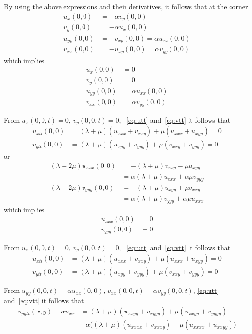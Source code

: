 \documentclass[11pt]{article}
\begin{document}
By using the above expressions and their derivatives, it follows that at the corner
\begin{align}
   u_x(0,0) &= - \alpha v_y(0,0) \\
   v_y(0,0) &= - \alpha u_x(0,0) \\
   u_{yy}(0,0) &= - v_{xy}(0,0) = \alpha u_{xx}(0,0) \\
   v_{xx}(0,0)&=-u_{xy}(0,0) = \alpha v_{yy}(0,0) 
\end{align}
which implies 
\begin{align}
   u_x(0,0) &=0 \\
   v_y(0,0) &=0 \\
   u_{yy}(0,0) &= \alpha u_{xx}(0,0) \\
   v_{xx}(0,0) &= \alpha v_{yy}(0,0) 
\end{align}

From $u_x(0,0,t)=0$, $v_y(0,0,t)=0$, ~\eqref{eq:utt} and~\eqref{eq:vtt} it follows that
\begin{align}
   u_{xtt}(0,0) &= (\lambda+\mu)(u_{xxx} + v_{xxy}) + \mu(u_{xxx} + u_{xyy}) =0 \\
   v_{ytt}(0,0) &= (\lambda+\mu)(u_{xyy} + v_{yyy}) + \mu(v_{xxy} + v_{yyy}) =0
\end{align}
or
\begin{align}
   (\lambda+2\mu)u_{xxx}(0,0) &= -(\lambda+\mu)v_{xxy} - \mu u_{xyy} \\
                         &= \alpha(\lambda+\mu)u_{xxx} +\alpha\mu v_{yyy} \\
   (\lambda+2\mu)v_{yyy}(0,0) &= -(\lambda+\mu)u_{xyy}+\mu v_{xxy} \\
                         &= \alpha(\lambda+\mu)v_{yyy} + \alpha \mu u_{xxx}
\end{align}
which implies
\begin{align}
   u_{xxx}(0,0) &=0 \\
   v_{yyy}(0,0) &=0 
\end{align}

From $u_x(0,0,t)=0$, $v_y(0,0,t)=0$, ~\eqref{eq:utt} and~\eqref{eq:vtt} it follows that
\begin{align}
   u_{xtt}(0,0) &= (\lambda+\mu)(u_{xxx} + v_{xxy}) + \mu(u_{xxx} + u_{xyy}) =0 \\
   v_{ytt}(0,0) &= (\lambda+\mu)(u_{xyy} + v_{yyy}) + \mu(v_{xxy} + v_{yyy}) =0
\end{align}


From $u_{yy}(0,0,t)=\alpha u_{xx}(0,0)$, $v_{xx}(0,0,t) = \alpha v_{yy}(0,0,t)$,
\eqref{eq:utt} and~\eqref{eq:vtt} it follows that
\begin{align}
   u_{yytt}(x,y)-\alpha u_{xx} &= (\lambda+\mu)(u_{xxyy} + v_{xyyy}) + \mu(u_{xxyy} + u_{yyyy}) \\
               & -\alpha\Big( (\lambda+\mu)(u_{xxxx} + v_{xxxy}) + \mu(u_{xxxx} + u_{xxyy}) \Big) 
\end{align}
\end{document}
